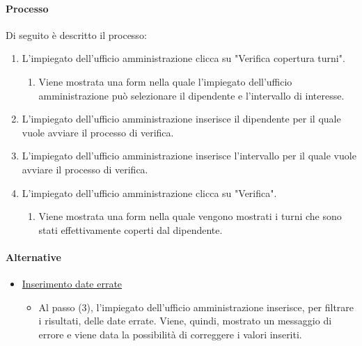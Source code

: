 \paragraph{Processo}
Di seguito è descritto il processo:
\begin{enumerate}
	\item L'impiegato dell'ufficio amministrazione clicca su "Verifica copertura turni".
		\begin{enumerate}
			\item Viene mostrata una form nella quale l'impiegato dell'ufficio amministrazione può selezionare il dipendente e l'intervallo di interesse.
		\end{enumerate}
	\item L'impiegato dell'ufficio amministrazione inserisce il dipendente per il quale vuole avviare il processo di verifica.
	\item L'impiegato dell'ufficio amministrazione inserisce l'intervallo per il quale vuole avviare il processo di verifica.
	\item L'impiegato dell'ufficio amministrazione clicca su "Verifica".
		\begin{enumerate}
			\item Viene mostrata una form nella quale vengono mostrati i turni che sono stati effettivamente coperti dal dipendente.
		\end{enumerate}
\end{enumerate}
\paragraph{Alternative}
\begin{itemize}
	\item \underline{Inserimento date errate}
		\begin{itemize}
			\item Al passo (3), l'impiegato dell'ufficio amministrazione inserisce, per filtrare i risultati, delle date errate. Viene, quindi, mostrato un messaggio di errore e viene data la possibilità di correggere i valori inseriti.
		\end{itemize}
\end{itemize}